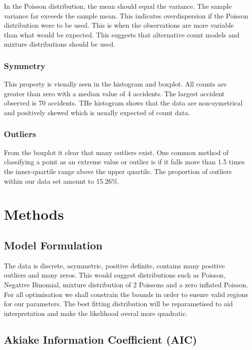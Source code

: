 \documentclass[11pt,preprint, authoryear]{elsarticle}
\numberwithin{equation}{section}
\numberwithin{figure}{section}
\numberwithin{table}{section}
\begin{document}
In the Poisson distribution, the mean should equal the variance. The
sample variance far exceeds the sample mean. This indicates
overdispersion if the Poisson distribution were to be used. This is when
the observations are more variable than what would be expected. This
suggests that alternative count models and mixture distributions should
be used.

\subsubsection{Symmetry}\label{symmetry}

This property is visually seen in the histogram and boxplot. All counts
are greater than zero with a median value of 4 accidents. The largest
accident observed is 70 accidents. THe histogram shows that the data are
non-symetrical and positively skewed which is usually expected of count
data.

\subsubsection{Outliers}\label{outliers}

From the boxplot it clear that many outliers exist. One common method of
classifying a point as an extreme value or outlier is if it falls more
than 1.5 times the inner-quartile range above the upper quartile. The
proportion of outliers within our data set amount to 15.26\%.

\section{Methods}\label{methods}

\subsection{Model Formulation}\label{model-formulation}

The data is discrete, asymmetric, positive definite, contains many
positive outliers and many zeros. This would suggest distributions such
as Poisson, Negative Binomial, mixture distribution of 2 Poissons and a
zero inflated Poisson. For all optimisation we shall constrain the
bounds in order to ensure valid regions for our parameters. The best
fitting distribution will be reparametised to aid interpretation and
make the likelihood overal more quadratic.

\subsection{Akiake Information Coefficient
(AIC)}\label{akiake-information-coefficient-aic}
\end{document}

